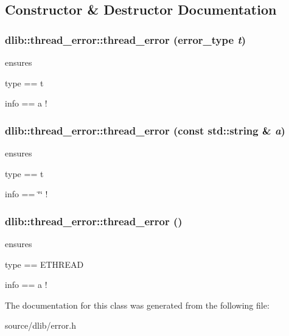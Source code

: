 \subsection{Constructor \& Destructor Documentation}
\hypertarget{classdlib_1_1thread__error_ae1bb1dd5554c6a336583d70935d3d11b}{
\subsubsection[{thread\_\-error}]{\setlength{\rightskip}{0pt plus 5cm}dlib::thread\_\-error::thread\_\-error (error\_\-type {\em t})}}
\label{classdlib_1_1thread__error_ae1bb1dd5554c6a336583d70935d3d11b}
ensures
\begin{DoxyItemize}
\item type == t
\item info == a ! 
\end{DoxyItemize}\hypertarget{classdlib_1_1thread__error_a8221371c972598642867232a88eeefbe}{
\subsubsection[{thread\_\-error}]{\setlength{\rightskip}{0pt plus 5cm}dlib::thread\_\-error::thread\_\-error (const std::string \& {\em a})}}
\label{classdlib_1_1thread__error_a8221371c972598642867232a88eeefbe}
ensures
\begin{DoxyItemize}
\item type == t
\item info == \char`\"{}\char`\"{} ! 
\end{DoxyItemize}\hypertarget{classdlib_1_1thread__error_a9a609b7d05a464663ebdd787b2a6e6d1}{
\subsubsection[{thread\_\-error}]{\setlength{\rightskip}{0pt plus 5cm}dlib::thread\_\-error::thread\_\-error ()}}
\label{classdlib_1_1thread__error_a9a609b7d05a464663ebdd787b2a6e6d1}
ensures
\begin{DoxyItemize}
\item type == ETHREAD
\item info == a ! 
\end{DoxyItemize}

The documentation for this class was generated from the following file:\begin{DoxyCompactItemize}
\item 
source/dlib/error.h\end{DoxyCompactItemize}
